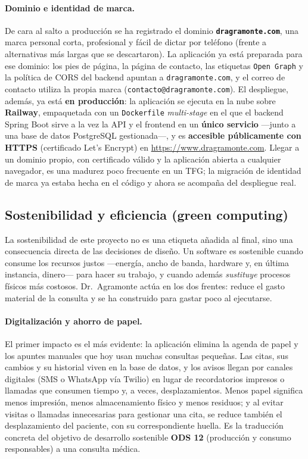 \documentclass[12pt,a4paper]{report}
\begin{document}
\paragraph{Dominio e identidad de marca.} De cara al salto a producción se ha registrado el dominio \textbf{\texttt{dragramonte.com}}, una marca personal corta, profesional y fácil de dictar por teléfono (frente a alternativas más largas que se descartaron). La aplicación ya está preparada para ese dominio: los pies de página, la página de contacto, las etiquetas \texttt{Open Graph} y la política de CORS del backend apuntan a \texttt{dragramonte.com}, y el correo de contacto utiliza la propia marca (\texttt{contacto@dragramonte.com}). El despliegue, además, ya está \textbf{en producción}: la aplicación se ejecuta en la nube sobre \textbf{Railway}, empaquetada con un \texttt{Dockerfile} \emph{multi-stage} en el que el backend Spring Boot sirve a la vez la API y el frontend en un \textbf{único servicio} —junto a una base de datos PostgreSQL gestionada—, y es \textbf{accesible públicamente con HTTPS} (certificado Let's Encrypt) en \url{https://www.dragramonte.com}. Llegar a un dominio propio, con certificado válido y la aplicación abierta a cualquier navegador, es una madurez poco frecuente en un TFG; la migración de identidad de marca ya estaba hecha en el código y ahora se acompaña del despliegue real.

\subsection{Sostenibilidad y eficiencia (green computing)}

La sostenibilidad de este proyecto no es una etiqueta añadida al final, sino una consecuencia directa de las decisiones de diseño. Un software es sostenible cuando consume los recursos justos —energía, ancho de banda, hardware y, en última instancia, dinero— para hacer su trabajo, y cuando además \emph{sustituye} procesos físicos más costosos. Dr.\ Agramonte actúa en los dos frentes: reduce el gasto material de la consulta y se ha construido para gastar poco al ejecutarse.

\paragraph{Digitalización y ahorro de papel.} El primer impacto es el más evidente: la aplicación elimina la agenda de papel y los apuntes manuales que hoy usan muchas consultas pequeñas. Las citas, sus cambios y su historial viven en la base de datos, y los avisos llegan por canales digitales (SMS o WhatsApp vía Twilio) en lugar de recordatorios impresos o llamadas que consumen tiempo y, a veces, desplazamientos. Menos papel significa menos impresión, menos almacenamiento físico y menos residuos; y al evitar visitas o llamadas innecesarias para gestionar una cita, se reduce también el desplazamiento del paciente, con su correspondiente huella. Es la traducción concreta del objetivo de desarrollo sostenible \textbf{ODS 12} (producción y consumo responsables) a una consulta médica.
\end{document}
